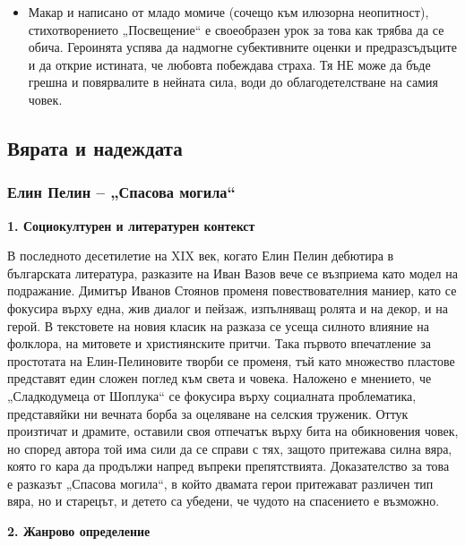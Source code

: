 \documentclass[12pt,a4paper]{article}
\begin{document}
\begin{itemize}[leftmargin=*]
\vspace{-0.65cm}
\item Макар и написано от младо момиче (сочещо към илюзорна неопитност), стихотворението „Посвещение“ е своеобразен урок за това как трябва да се обича. Героинята успява да надмогне субективните оценки и предразсъдъците и да открие истината, че любовта побеждава страха. Тя НЕ може да бъде грешна и повярвалите в нейната сила, води до облагодетелстване на самия човек.
\end{itemize}
\newpage

\subsection{Вярата и надеждата}
\subsubsection{\colorbox{green!40}{Елин Пелин – „Спасова могила“}}

\textbf{1. Социокултурен и литературен контекст}
\vspace{0.1cm}
 
\indent В последното десетилетие на XIX век, когато Елин Пелин дебютира в българската литература, разказите на Иван Вазов вече се възприема като модел на подражание. Димитър Иванов Стоянов променя повествователния маниер, като се фокусира върху една, жив диалог и пейзаж, изпълняващ ролята и на декор, и на герой. В текстовете на новия класик на разказа се усеща силното влияние на фолклора, на митовете и християнските притчи. Така първото впечатление за простотата на Елин-Пелиновите творби се променя, тъй като множество пластове представят един сложен поглед към света и човека. Наложено е мнението, че „Сладкодумеца от Шоплука“ се фокусира върху социалната проблематика, представяйки ни вечната борба за оцеляване на селския труженик. Оттук произтичат и драмите, оставили своя отпечатък върху бита на обикновения човек, но според автора той има сили да се справи с тях, защото притежава силна вяра, която го кара да продължи напред въпреки препятствията. Доказателство за това е разказът „Спасова могила“, в който двамата герои притежават различен тип вяра, но и старецът, и детето са убедени, че чудото на спасението е възможно.

\vspace{0.1cm}
 
\noindent 
\textbf{2. Жанрово определение}
\vspace{0.1cm}
 
\end{document}

